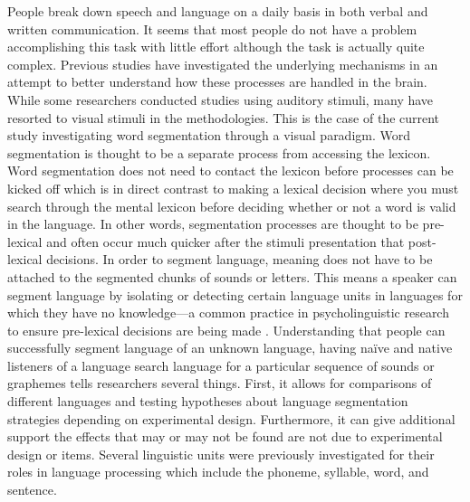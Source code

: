 People break down speech and language on a daily basis in both verbal and written communication. It seems that most people do not have a problem accomplishing this task with little effort although the task is actually quite complex. Previous studies have investigated the underlying mechanisms in an attempt to better understand how these processes are handled in the brain. While some researchers conducted studies using auditory stimuli, many have resorted to visual stimuli in the methodologies. This is the case of the current study investigating word segmentation through a visual paradigm. Word segmentation is thought to be a separate process from accessing the lexicon. Word segmentation does not need to contact the lexicon before processes can be kicked off which is in direct contrast to making a lexical decision where you must search through the mental lexicon before deciding whether or not a word is valid in the language. In other words, segmentation processes are thought to be pre-lexical and often occur much quicker after the stimuli presentation that post-lexical decisions. In order to segment language, meaning does not have to be attached to the segmented chunks of sounds or letters. This means a speaker can segment language by isolating or detecting certain language units in languages for which they have no knowledge—a common practice in psycholinguistic research to ensure pre-lexical decisions are being made \parencite{Cutler1986-zl}. Understanding that people can successfully segment language of an unknown language, having naïve and native listeners of a language search language for a particular sequence of sounds or graphemes tells researchers several things. First, it allows for comparisons of different languages and testing hypotheses about language segmentation strategies depending on experimental design. Furthermore, it can give additional support the effects that may or may not be found are not due to experimental design or items. Several linguistic units were previously investigated for their roles in language processing which include the phoneme, syllable, word, and sentence. 



